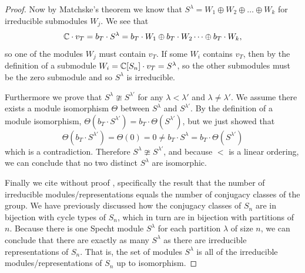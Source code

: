 \documentclass[12pt,twoside]{reedthesis}
\theoremstyle{plain}   %
\theoremstyle{definition}
\theoremstyle{remark}
\numberwithin{equation}{section}
\begin{document}
\begin{proof}
     Now by Matchske's theorem we know that $S^\lambda = W_1 \oplus W_2 \oplus \dots \oplus W_k$ for irreducible submodules $W_j$.
     We see that
     \[\mathbb{C} \cdot v_T = b_T \cdot S^\lambda = b_T \cdot W_1 \oplus b_T \cdot W_2 \dots \oplus b_T \cdot W_k,\]
     so one of the modules $W_j$ must contain $v_T$.
     If some $W_i$ contains $v_T$, then by the definition of a submodule $W_i = \mathbb{C} [S_n] \cdot v_T = S^\lambda$, so
     the other submodules must be the zero submodule and so $S^\lambda$ is irreducible.
     \par
     Furthermore we prove that $S^\lambda  \ncong S^{\lambda'}$ for any $\lambda < \lambda'$ and $\lambda \neq \lambda'$.
     We assume there exists a module isomorphism $\Theta$ between $S^\lambda$ and $S^{\lambda'}$.
     By the definition of a module isomorphism, $\Theta(b_T \cdot S^{\lambda'}) = b_T \cdot \Theta( S^{\lambda'})$,
     but we just showed that
     \[\Theta(b_T \cdot S^{\lambda'}) = \Theta(0) = 0 \neq b_T \cdot S^\lambda = b_T \cdot \Theta( S^{\lambda'})\]
     which is a contradiction. Therefore $S^\lambda \ncong S^{\lambda'}$, and because $<$ is a linear ordering, we can conclude that
     no two distinct $S^\lambda$ are isomorphic. \par
     Finally we cite without proof \cite[Proposition 1.10.1]{sagan}, specifically the result that the number of irreducible modules/representations equals
     the number of conjugacy classes of the group. We have previously discussed how the conjugacy classes of $S_n$ are in bijection with cycle types of $S_n$,
     which in turn are in bijection with partitions of $n$.
     Because there is one Specht module $S^\lambda$ for each partition $\lambda$ of size $n$,
     we can conclude that there are exactly as many $S^\lambda$ as there are irreducible representations of $S_n$.
     That is, the set of modules $S^\lambda$ is all of the irreducible modules/representations of $S_n$ up to isomorphism.
   \end{proof}
   
\end{document}
